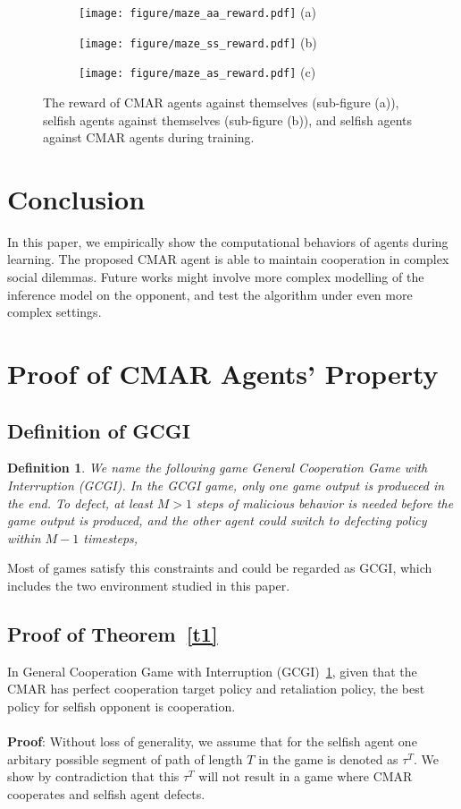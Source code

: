 \documentclass{article}
\newtheorem{definition}{Definition}
\begin{document}
\begin{figure}
\begin{subfigure}{.33\textwidth}
\centering
\texttt{[image: figure/maze\_aa\_reward.pdf]}
(a)
\end{subfigure}
\begin{subfigure}{.33\textwidth}
\centering
\texttt{[image: figure/maze\_ss\_reward.pdf]}
(b)
\end{subfigure}
\begin{subfigure}{.33\textwidth}
\centering
\texttt{[image: figure/maze\_as\_reward.pdf]}
(c)
\end{subfigure}
    \caption{
The reward of CMAR agents against themselves (sub-figure (a)),
selfish agents against themselves (sub-figure (b)),
    and selfish agents against CMAR agents during training.}
\label{fig:maze}
\end{figure}
\section{Conclusion}
In this paper, we empirically show the computational behaviors of agents during learning.
The proposed CMAR agent is able to maintain cooperation in complex social dilemmas.
Future works might involve more complex modelling of the inference model on the opponent,
and test the algorithm under even more complex settings.


\appendix
\section{Proof of CMAR Agents' Property}
\subsection{Definition of GCGI}
\begin{definition}\label{appd1}
We name the following game \emph{General Cooperation Game with Interruption (GCGI)}.
In the GCGI game, only one game output is produeced in the end.
    To defect,
    at least \(M>1\) steps of malicious behavior is needed before the game output is produced,
    and the other agent could switch to defecting policy within \(M - 1\) timesteps,
\end{definition}
Most of games satisfy this constraints and could be regarded as GCGI,
which includes the two environment studied in this paper.

\subsection{Proof of Theorem~\ref{t1}}\label{appt1}
    In General Cooperation Game with Interruption (GCGI)~\ref{appd1},
    given that the CMAR has perfect cooperation target policy and retaliation policy,
    the best policy for selfish opponent is cooperation.\\\\
\textbf{Proof}:
Without loss of generality,
we assume that for the selfish agent
one arbitary possible segment of path of length \(T\) in the game is denoted as \(\tau^T\).
We show by contradiction that this \(\tau^T\) will not result in a game
where CMAR cooperates and selfish agent defects.
\end{document}

